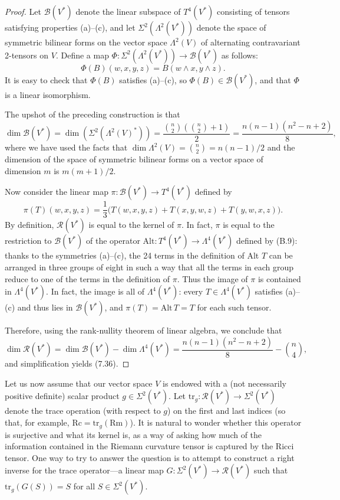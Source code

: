\begin{proof}
Let $\mathscr{B}(V^*)$ denote the linear subspace of $T^4(V^*)$ consisting of tensors satisfying properties (a)--(c), and let $\Sigma^2\left(\Lambda^2(V^*)\right)$ denote the space of symmetric bilinear forms on the vector space $\Lambda^2(V)$ of alternating contravariant 2-tensors on $V$. Define a map $\Phi: \Sigma^2\left(\Lambda^2(V^*)\right) \to \mathscr{B}(V^*)$ as follows:
\[
\Phi(B)(w,x,y,z) = B(w \wedge x, y \wedge z).
\]
It is easy to check that $\Phi(B)$ satisfies (a)--(c), so $\Phi(B) \in \mathscr{B}(V^*)$, and that $\Phi$ is a linear isomorphism.

The upshot of the preceding construction is that
\[
\dim \mathcal{B}(V^*) = \dim\left(\Sigma^2(\Lambda^2(V)^*)\right) = \frac{\binom{n}{2}\left(\binom{n}{2}+1\right)}{2} = \frac{n(n-1)(n^2-n+2)}{8},
\]
where we have used the facts that $\dim \Lambda^2(V) = \binom{n}{2} = n(n-1)/2$ and the dimension of the space of symmetric bilinear forms on a vector space of dimension $m$ is $m(m+1)/2$.

Now consider the linear map $\pi: \mathcal{B}(V^*) \to T^4(V^*)$ defined by
\[
\pi(T)(w,x,y,z) = \frac{1}{3}\bigl(T(w,x,y,z) + T(x,y,w,z) + T(y,w,x,z)\bigr).
\]
By definition, $\mathcal{R}(V^*)$ is equal to the kernel of $\pi$. In fact, $\pi$ is equal to the restriction to $\mathcal{B}(V^*)$ of the operator $\text{Alt}: T^4(V^*) \to \Lambda^4(V^*)$ defined by (B.9): thanks to the symmetries (a)--(c), the 24 terms in the definition of Alt $T$ can be arranged in three groups of eight in such a way that all the terms in each group reduce to one of the terms in the definition of $\pi$. Thus the image of $\pi$ is contained in $\Lambda^4(V^*)$. In fact, the image is all of $\Lambda^4(V^*)$: every $T \in \Lambda^4(V^*)$ satisfies (a)--(c) and thus lies in $\mathcal{B}(V^*)$, and $\pi(T) = \text{Alt} \, T = T$ for each such tensor.

Therefore, using the rank-nullity theorem of linear algebra, we conclude that
\[
\dim \mathcal{R}(V^*) = \dim \mathcal{B}(V^*) - \dim \Lambda^4(V^*) = \frac{n(n-1)(n^2-n+2)}{8} - \binom{n}{4},
\]
and simplification yields (7.36).
\end{proof}

Let us now assume that our vector space $V$ is endowed with a (not necessarily positive definite) scalar product $g \in \Sigma^2(V^*)$. Let $\text{tr}_g: \mathcal{R}(V^*) \to \Sigma^2(V^*)$ denote the trace operation (with respect to $g$) on the first and last indices (so that, for example, $\mathrm{Rc} = \text{tr}_g(\mathrm{Rm})$). It is natural to wonder whether this operator is surjective and what its kernel is, as a way of asking how much of the information contained in the Riemann curvature tensor is captured by the Ricci tensor. One way to try to answer the question is to attempt to construct a right inverse for the trace operator---a linear map $G: \Sigma^2(V^*) \to \mathcal{R}(V^*)$ such that $\text{tr}_g(G(S)) = S$ for all $S \in \Sigma^2(V^*)$.

